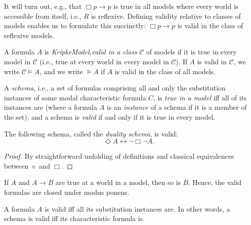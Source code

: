 It will turn out, e.g., that $\Box p \to p$ is true in all models where every 
world is accessible from itself, i.e., $R$ is reflexive. Defining validity 
relative to classes of models enables us to formulate this succinctly: 
$\Box p \to p$ is valid in the class of reflexive models.

\begin{definition}
  \label{valid-in-class}
  A formula $A$ is \emph{KripkeModel,valid in a class} $\mathcal{C}$ 
of models if it is true in every model in $\mathcal{C}$ (i.e., true at every 
world in every model in $\mathcal{C}$). If $A$ is valid in $\mathcal{C}$, we 
write $\mathcal{C} \vDash A$, and we write $\vDash A$ if $A$ is valid in the 
class of all models.
\end{definition}

\begin{definition}
  \label{valid-schema}
A \emph{schema}, i.e., a set of formulas comprising all and 
only the substitution instances of some modal characteristic formula $C$, 
is \emph{true in a model} iff all of its instances are 
(where a formula $A$ is an \emph{instance} of a schema if it is a 
member of the set); and a schema is \emph{valid} if and only if it is 
true in every model.
\end{definition}

\begin{proposition}
  \label{duality-schema}
  \leanok
The following schema, called the \emph{duality schema}, is valid:
\[
\Diamond A \leftrightarrow \neg \Box \neg A.
\]
\end{proposition}
\begin{proof}
  \label{proof:duality-schema}
  \leanok
  By straightforward unfolding of definitions and classical equivalences between \(\diamond\) and \(\Box\).
\end{proof}

\begin{proposition}
  \label{modus-ponens-validity}
  If $A$ and $A \rightarrow B$ are true at a world in a model,
  then so is $B$. Hence, the valid formulas are closed under modus ponens.
\end{proposition}

\begin{proposition}
  \label{substitution-validity}
  A formula $A$ is valid iff all its substitution instances are.
  In other words, a schema is valid iff its characteristic formula is.
\end{proposition}

